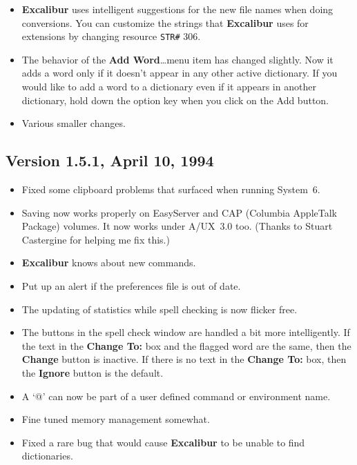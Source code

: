 \documentclass[11pt,titlepage]{article}
\newcommand{\ex}{\textbf{Excalibur}}
\begin{document}
\begin{itemize}
\item \ex{} uses intelligent suggestions for the new file names when
  doing conversions.  You can customize the strings that \ex{} uses
  for extensions by changing resource \verb+STR#+ 306.

\item The behavior of the \textbf{Add Word}\ldots menu item has
  changed slightly.  Now it adds a word only if it doesn't appear in
  any other active dictionary.  If you would like to add a word to a
  dictionary even if it appears in another dictionary, hold down the
  option key when you click on the Add button.

\item Various smaller changes.

\end{itemize}

\subsection{Version 1.5.1, April 10, 1994}

\begin{itemize}

\item Fixed some clipboard problems that surfaced when running
  System~6.

\item Saving now works properly on EasyServer and CAP (Columbia
  AppleTalk Package) volumes.  It now works under A/UX~3.0 too.
  (Thanks to Stuart Castergine for helping me fix this.)

\item \ex{} knows about new \LaTeXe{} commands.

\item Put up an alert if the preferences file is out of date.

\item The updating of statistics while spell checking is now flicker
  free.

\item The buttons in the spell check window are handled a bit more
  intelligently. If the text in the \textbf{Change To:} box and the
  flagged word are the same, then the \textbf{Change} button is
  inactive.  If there is no text in the \textbf{Change To:} box, then
  the \textbf{Ignore} button is the default.

\item A `@' can now be part of a user defined command or environment
  name.

\item Fine tuned memory management somewhat.

\item Fixed a rare bug that would cause \ex{} to be unable to find
  dictionaries.

\end{itemize}
\end{document}
